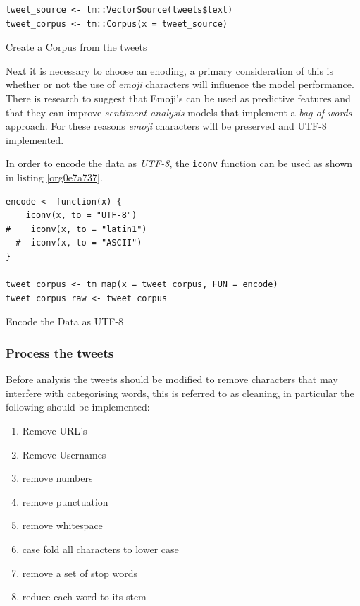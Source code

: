 \documentclass[11pt]{article}
\begin{document}
\begin{listing}[htbp]
\begin{verbatim}
tweet_source <- tm::VectorSource(tweets$text)
tweet_corpus <- tm::Corpus(x = tweet_source)
\end{verbatim}
\caption{\label{org648d8b6}Create a Corpus from the tweets}
\end{listing}

Next it is necessary to choose an enoding, a primary consideration of this is whether or not the use of \emph{emoji} characters will influence the model performance. There is research to suggest that Emoji's can be used as predictive features \cite{lecompte2017} and that they can improve \emph{sentiment analysis} models \cite{shiha2017} that implement a \emph{bag of words} approach. For these reasons \emph{emoji} characters will be preserved and \href{http://www.utf-8.com/}{UTF-8} implemented.

In order to encode the data as \emph{UTF-8}, the \texttt{iconv} function can be used as shown in listing \ref{org0e7a737}.

\begin{listing}[htbp]
\begin{verbatim}
encode <- function(x) {
    iconv(x, to = "UTF-8")
#    iconv(x, to = "latin1")
  #  iconv(x, to = "ASCII")
}

tweet_corpus <- tm_map(x = tweet_corpus, FUN = encode)
tweet_corpus_raw <- tweet_corpus
\end{verbatim}
\caption{\label{org0e7a737}Encode the Data as UTF-8}
\end{listing}

\subsubsection{Process the tweets}
\label{sec:orgfb93744}
Before analysis the tweets should be modified to remove characters that may interfere with categorising words, this is referred to as cleaning, in particular the following should be implemented:

\begin{enumerate}
\item Remove URL's
\item Remove Usernames
\item remove numbers
\item remove punctuation
\item remove whitespace
\item case fold all characters to lower case
\item remove a set of stop words
\item reduce each word to its stem
\end{enumerate}
\end{document}
